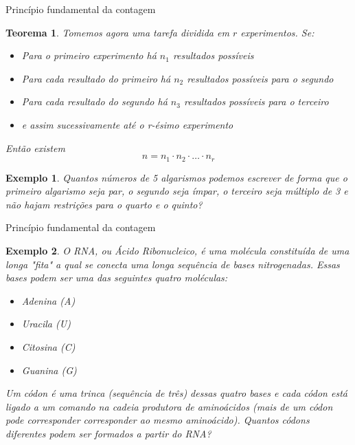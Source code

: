 \documentclass{beamer}
\newtheorem{teorema}{Teorema}
\newtheorem{exemplo}{Exemplo}
\begin{document}
\begin{frame}{Princípio fundamental da contagem}
\begin{teorema}
    Tomemos agora uma tarefa dividida em $r$ experimentos. Se:
    \begin{itemize}
        \item Para o primeiro experimento há $n_1$ resultados possíveis
        \item Para cada resultado do primeiro há $n_2$ resultados possíveis para o segundo 
        \item Para cada resultado do segundo há $n_3$ resultados possíveis para o terceiro
        \item e assim sucessivamente até o r-ésimo experimento
    \end{itemize}
    Então existem
    $$n = n_1 \cdot n_2 \cdot \dots \cdot n_r$$
\end{teorema}
    
\end{frame}

\begin{frame}
    \begin{exemplo}
        Quantos números de 5 algarismos podemos escrever de forma que o primeiro algarismo seja par, o segundo seja ímpar, o terceiro seja múltiplo de 3 e não hajam restrições para o quarto e o quinto?
    \end{exemplo}
\end{frame}

\begin{frame}{Princípio fundamental da contagem}
\begin{exemplo}
O RNA, ou Ácido Ribonucleico, é uma molécula constituída de uma longa "fita" a qual se conecta uma longa sequência de bases nitrogenadas. Essas bases podem ser uma das seguintes quatro moléculas:
\begin{itemize}
    \item Adenina (A)
    \item Uracila (U)
    \item Citosina (C)
    \item Guanina (G)
\end{itemize}
Um códon é uma trinca (sequência de três) dessas quatro bases e cada códon está ligado a um comando na cadeia produtora de aminoácidos (mais de um códon pode corresponder corresponder ao mesmo aminoácido). Quantos códons diferentes podem ser formados a partir do RNA?
\end{exemplo}
\end{frame}
\end{document}
